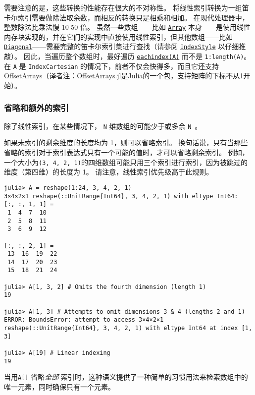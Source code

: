 需要注意的是，这些转换的性能存在很大的不对称性。 将线性索引转换为一组笛卡尔索引需要做除法取余数，而相反的转换只是相乘和相加。 在现代处理器中，整数除法比乘法慢 10-50 倍。 虽然一些数组——比如 \hyperlink{15492651498431872487}{\texttt{Array}} 本身——是使用线性内存块实现的，并在它们的实现中直接使用线性索引，但其他数组——比如 \hyperlink{3300114559258360989}{\texttt{Diagonal}}——需要完整的笛卡尔索引集进行查找（请参阅 \hyperlink{7782790551324367092}{\texttt{IndexStyle}} 以仔细推敲）。 因此，当遍历整个数组时，最好遍历 \hyperlink{4701773772897287974}{\texttt{eachindex(A)}} 而不是 \texttt{1:length(A)}。 在 \texttt{A} 是 \texttt{IndexCartesian} 的情况下，前者不仅会快得多，而且它还支持 OffsetArrays（译者注：OffsetArrays.jl是Julia的一个包，支持矩阵的下标不从1开始）。



\hypertarget{3274469472431833212}{}


\subsubsection{省略和额外的索引}



除了线性索引，在某些情况下， \texttt{N} 维数组的可能少于或多余  \texttt{N} 。



如果未索引的剩余维度的长度均为 1，则可以省略索引。 换句话说，只有当那些省略的索引对于索引表达式只有一个可能的值时，才可以省略剩余索引。 例如，一个大小为\texttt{(3, 4, 2, 1)}的四维数组可能只用三个索引进行索引，因为被跳过的维度（第四维）的长度为 1。 请注意，线性索引优先级高于此规则。




\begin{verbatim}
julia> A = reshape(1:24, 3, 4, 2, 1)
3×4×2×1 reshape(::UnitRange{Int64}, 3, 4, 2, 1) with eltype Int64:
[:, :, 1, 1] =
 1  4  7  10
 2  5  8  11
 3  6  9  12

[:, :, 2, 1] =
 13  16  19  22
 14  17  20  23
 15  18  21  24

julia> A[1, 3, 2] # Omits the fourth dimension (length 1)
19

julia> A[1, 3] # Attempts to omit dimensions 3 & 4 (lengths 2 and 1)
ERROR: BoundsError: attempt to access 3×4×2×1 reshape(::UnitRange{Int64}, 3, 4, 2, 1) with eltype Int64 at index [1, 3]

julia> A[19] # Linear indexing
19
\end{verbatim}



当用\texttt{A[]} 省略\emph{全部} 索引时，这种语义提供了一种简单的习惯用法来检索数组中的唯一元素，同时确保只有一个元素。



